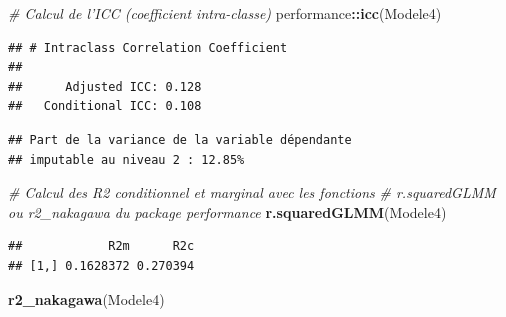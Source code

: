 \documentclass[
  11pt,
  french,
]{book}
\makeatletter
\newenvironment{Shaded}{\begin{snugshade}}{\end{snugshade}}
\newcommand{\CharTok}[1]{\textcolor[rgb]{0.31,0.60,0.02}{#1}}
\newcommand{\CommentTok}[1]{\textcolor[rgb]{0.56,0.35,0.01}{\textit{#1}}}
\newcommand{\DataTypeTok}[1]{\textcolor[rgb]{0.13,0.29,0.53}{#1}}
\newcommand{\DecValTok}[1]{\textcolor[rgb]{0.00,0.00,0.81}{#1}}
\newcommand{\KeywordTok}[1]{\textcolor[rgb]{0.13,0.29,0.53}{\textbf{#1}}}
\newcommand{\NormalTok}[1]{#1}
\newcommand{\OperatorTok}[1]{\textcolor[rgb]{0.81,0.36,0.00}{\textbf{#1}}}
\newcommand{\StringTok}[1]{\textcolor[rgb]{0.31,0.60,0.02}{#1}}
\newenvironment{kframe}{%
\medskip{}
\setlength{\fboxsep}{.8em}
 \def\at@end@of@kframe{}%
 \ifinner\ifhmode%
  \def\at@end@of@kframe{\end{minipage}}%
  \begin{minipage}{\columnwidth}%
 \fi\fi%
 \def\FrameCommand##1{\hskip\@totalleftmargin \hskip-\fboxsep
 \colorbox{shadecolor}{##1}\hskip-\fboxsep
     \hskip-\linewidth \hskip-\@totalleftmargin \hskip\columnwidth}%
 \MakeFramed {\advance\hsize-\width
   \@totalleftmargin\z@ \linewidth\hsize
   \@setminipage}}%
 {\par\unskip\endMakeFramed%
 \at@end@of@kframe}
\renewenvironment{Shaded}{\begin{kframe}}{\end{kframe}}
\makeatother
\begin{document}
\begin{Shaded}
\begin{Highlighting}[]
\CommentTok{# Calcul de l'ICC (coefficient intra-classe)}
\NormalTok{performance}\OperatorTok{::}\KeywordTok{icc}\NormalTok{(Modele4)}
\end{Highlighting}
\end{Shaded}

\begin{verbatim}
## # Intraclass Correlation Coefficient
## 
##      Adjusted ICC: 0.128
##   Conditional ICC: 0.108
\end{verbatim}

\begin{Shaded}
\end{Shaded}

\begin{verbatim}
## Part de la variance de la variable dépendante 
## imputable au niveau 2 : 12.85%
\end{verbatim}

\begin{Shaded}
\begin{Highlighting}[]
\CommentTok{# Calcul des R2 conditionnel et marginal avec les fonctions}
\CommentTok{# r.squaredGLMM ou r2_nakagawa du package performance}
\KeywordTok{r.squaredGLMM}\NormalTok{(Modele4)}
\end{Highlighting}
\end{Shaded}

\begin{verbatim}
##            R2m      R2c
## [1,] 0.1628372 0.270394
\end{verbatim}

\begin{Shaded}
\begin{Highlighting}[]
\KeywordTok{r2_nakagawa}\NormalTok{(Modele4)}
\end{Highlighting}
\end{Shaded}
\end{document}
